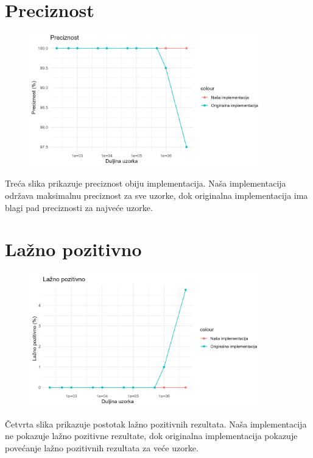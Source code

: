 \documentclass[seminarskirad]{fer}
\begin{document}
\section{Preciznost}
\begin{figure}[h]
	\centering
	\includegraphics[width=0.9\textwidth]{images/nasumicni_rezultati_preciznost.png}
	\label{fig:nasumicni_rezultati_preciznost}
\end{figure}
Treća slika prikazuje preciznost obiju implementacija. Naša implementacija održava maksimalnu preciznost za sve uzorke, dok originalna implementacija ima blagi pad preciznosti za najveće uzorke.

\section{Lažno pozitivno}
\begin{figure}[h]
	\centering
	\includegraphics[width=0.9\textwidth]{images/nasumicni_rezultati_lazno.png}
	\label{fig:nasumicni_rezultati_lazno}
\end{figure}
Četvrta slika prikazuje postotak lažno pozitivnih rezultata. Naša implementacija ne pokazuje lažno pozitivne rezultate, dok originalna implementacija pokazuje povećanje lažno pozitivnih rezultata za veće uzorke.
\end{document}
